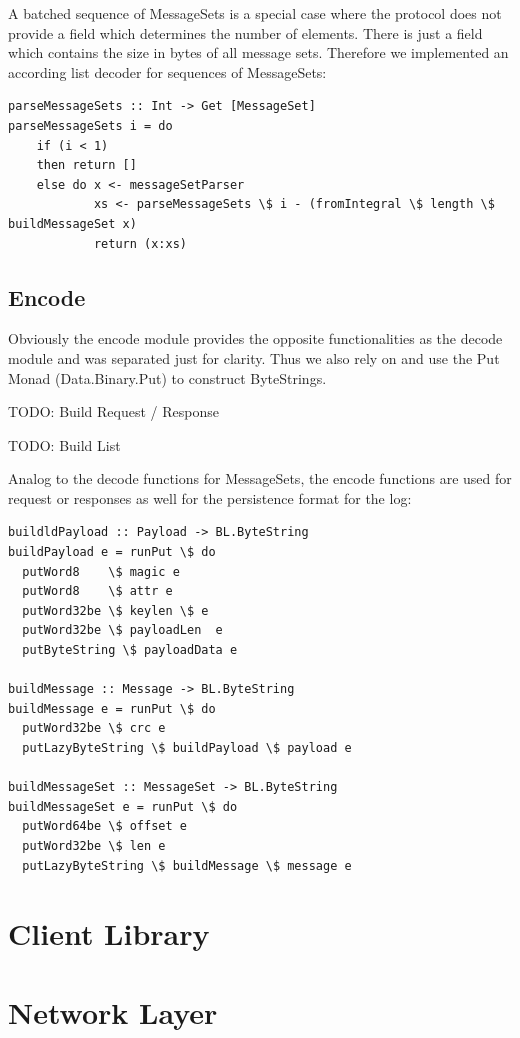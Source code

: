 A batched sequence of MessageSets is a special case where the protocol does not provide a
field which determines the number of elements. There is just a field which contains
the size in bytes of all message sets. Therefore we implemented an according
list decoder for sequences of MessageSets:
\begin{lstlisting}
parseMessageSets :: Int -> Get [MessageSet]
parseMessageSets i = do
    if (i < 1)
    then return []
    else do x <- messageSetParser
            xs <- parseMessageSets \$ i - (fromIntegral \$ length \$ buildMessageSet x)
            return (x:xs)
\end{lstlisting}

\subsection{Encode}%
Obviously the encode module provides the opposite functionalities as the decode
module and was separated just for clarity. Thus we also rely on
and use the Put Monad (Data.Binary.Put) to construct ByteStrings.

TODO: Build Request / Response

TODO: Build List 

Analog to the decode functions for MessageSets, the encode functions are
used for request or responses as well for the persistence format for the log:

\begin{lstlisting}
buildldPayload :: Payload -> BL.ByteString 
buildPayload e = runPut \$ do 
  putWord8    \$ magic e
  putWord8    \$ attr e
  putWord32be \$ keylen \$ e
  putWord32be \$ payloadLen  e
  putByteString \$ payloadData e

buildMessage :: Message -> BL.ByteString
buildMessage e = runPut \$ do 
  putWord32be \$ crc e
  putLazyByteString \$ buildPayload \$ payload e 

buildMessageSet :: MessageSet -> BL.ByteString
buildMessageSet e = runPut \$ do 
  putWord64be \$ offset e
  putWord32be \$ len e
  putLazyByteString \$ buildMessage \$ message e
\end{lstlisting}

\section{Client Library}

\section{Network Layer}

